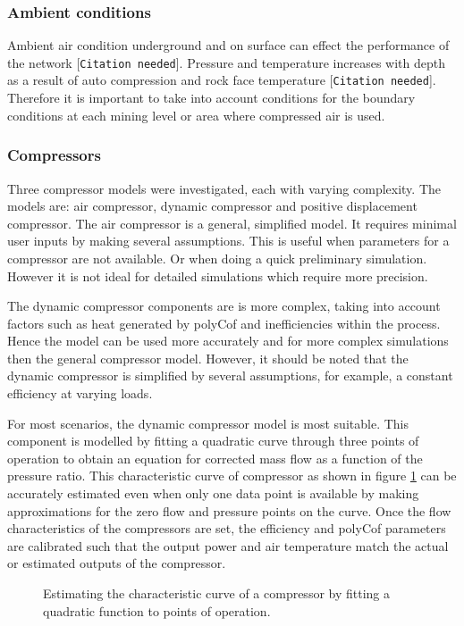 		\subsubsection{Ambient conditions}
		Ambient air condition underground and on surface can effect the performance of the network [\texttt{Citation needed}]. Pressure and temperature increases with depth as a result of auto compression and rock face temperature [\texttt{Citation needed}]. Therefore it is important to take into account conditions for the boundary conditions at each mining level or area where compressed air is used.   
		\subsubsection{Compressors}
		Three compressor models were investigated, each with varying complexity. The models are: air compressor, dynamic compressor and positive displacement compressor. The air compressor is a general, simplified model. It requires minimal user inputs by making several assumptions. This is useful when parameters for a compressor are not available. Or when doing a quick preliminary simulation. However it is not ideal for detailed simulations which require more precision. 
		\par 
		The dynamic compressor components are is more complex, taking into account factors such as heat generated by \gls{polyCof} and inefficiencies within the process. Hence the model can be used more accurately and for more complex simulations then the general compressor model. However, it should be noted that the dynamic compressor is simplified by several assumptions, for example, a constant efficiency at varying loads. 
		\par 	 
		For most scenarios, the dynamic compressor model is most suitable. This component is modelled by fitting a quadratic curve through three points of operation to obtain an equation for corrected mass flow as a function of the pressure ratio. This characteristic curve of compressor  as shown in figure \ref{fig: Compressor Curve} can be accurately estimated even when only one data point is available by making approximations for the zero flow and pressure points on the curve. Once the flow characteristics of the compressors are set, the efficiency and \gls{polyCof} parameters are calibrated such that the output power and air temperature match the actual or estimated outputs of the compressor.
		
		\begin{figure}[h]
			\centering
			\fbox{}
			\caption{Estimating the characteristic curve of a compressor by fitting a quadratic function to points of operation.}
			\label{fig: Compressor Curve}
		\end{figure}

